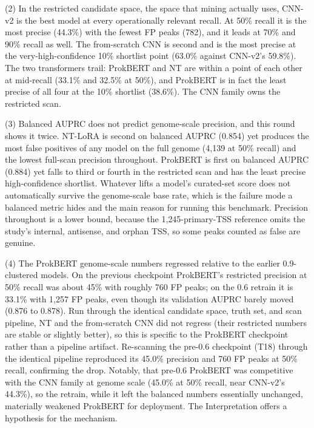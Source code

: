 \documentclass{article}
\begin{document}
(2) In the restricted candidate space, the space that mining actually uses, CNN-v2 is the best model at every operationally relevant recall. At 50\% recall it is the most precise (44.3\%) with the fewest FP peaks (782), and it leads at 70\% and 90\% recall as well. The from-scratch CNN is second and is the most precise at the very-high-confidence 10\% shortlist point (63.0\% against CNN-v2's 59.8\%). The two transformers trail: ProkBERT and NT are within a point of each other at mid-recall (33.1\% and 32.5\% at 50\%), and ProkBERT is in fact the least precise of all four at the 10\% shortlist (38.6\%). The CNN family owns the restricted scan.

(3) Balanced AUPRC does not predict genome-scale precision, and this round shows it twice. NT-LoRA is second on balanced AUPRC (0.854) yet produces the most false positives of any model on the full genome (4{,}139 at 50\% recall) and the lowest full-scan precision throughout. ProkBERT is first on balanced AUPRC (0.884) yet falls to third or fourth in the restricted scan and has the least precise high-confidence shortlist. Whatever lifts a model's curated-set score does not automatically survive the genome-scale base rate, which is the failure mode a balanced metric hides and the main reason for running this benchmark. Precision throughout is a lower bound, because the 1{,}245-primary-TSS reference omits the study's internal, antisense, and orphan TSS, so some peaks counted as false are genuine.

(4) The ProkBERT genome-scale numbers regressed relative to the earlier 0.9-clustered models. On the previous checkpoint ProkBERT's restricted precision at 50\% recall was about 45\% with roughly 760 FP peaks; on the 0.6 retrain it is 33.1\% with 1{,}257 FP peaks, even though its validation AUPRC barely moved (0.876 to 0.878). Run through the identical candidate space, truth set, and scan pipeline, NT and the from-scratch CNN did not regress (their restricted numbers are stable or slightly better), so this is specific to the ProkBERT checkpoint rather than a pipeline artifact. Re-scanning the pre-0.6 checkpoint (T18) through the identical pipeline reproduced its 45.0\% precision and 760 FP peaks at 50\% recall, confirming the drop. Notably, that pre-0.6 ProkBERT was competitive with the CNN family at genome scale (45.0\% at 50\% recall, near CNN-v2's 44.3\%), so the retrain, while it left the balanced numbers essentially unchanged, materially weakened ProkBERT for deployment. The Interpretation offers a hypothesis for the mechanism.
\end{document}
